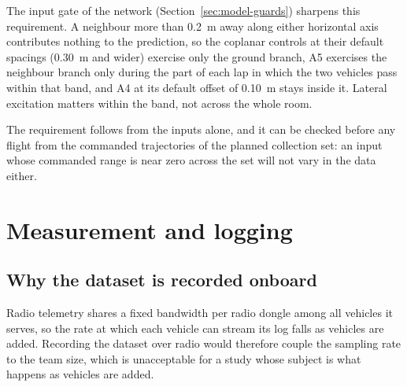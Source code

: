 The input gate of the network (Section~\ref{sec:model-guards}) sharpens this requirement. A
neighbour more than \SI{0.2}{\metre} away along either horizontal axis contributes nothing to the
prediction, so the coplanar controls at their default spacings (\SI{0.30}{\metre} and wider) exercise
only the ground branch, A5 exercises the neighbour branch only during the part of each lap in which
the two vehicles pass within that band, and A4 at its default offset of \SI{0.10}{\metre} stays inside
it. Lateral excitation matters within the band, not across the whole room.

The requirement follows from the inputs alone, and it can be checked before any flight from the
commanded trajectories of the planned collection set: an input whose commanded range is near zero
across the set will not vary in the data either.

\section{Measurement and logging}
\label{sec:setup-logging}

\subsection{Why the dataset is recorded onboard}

Radio telemetry shares a fixed bandwidth per radio dongle among all vehicles it serves, so the rate
at which each vehicle can stream its log falls as vehicles are added. Recording the dataset over
radio would therefore couple the sampling rate to the team size, which is unacceptable for a study
whose subject is what happens as vehicles are added.

